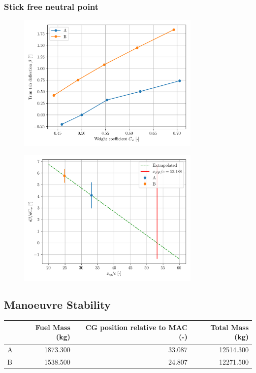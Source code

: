\documentclass{article}
\begin{document}
\subsubsection{Stick free neutral point}
\begin{figure}[H]
    \centering
    \includegraphics[width=0.8\textwidth]{Longitudinal_Static_Stability_3.png}
    \caption{}
    \label{fig:Longitudinal_Static_Stability_3}
\end{figure}
\begin{figure}[H]
    \centering
    \includegraphics[width=0.8\textwidth]{Longitudinal_Static_Stability_4.png}
    \caption{}
    \label{fig:Longitudinal_Static_Stability_4}
\end{figure}

\subsection{Manoeuvre Stability}

\begin{table}[H]
    \centering
    \begin{tabular}{lrrr}
        \toprule
         & Fuel Mass (kg) & CG position relative to MAC (-) & Total Mass (kg) \\
        \midrule
        A & 1873.300 & 33.087 & 12514.300 \\
        B & 1538.500 & 24.807 & 12271.500 \\
        \bottomrule
        \end{tabular}
\end{table}
\end{document}
